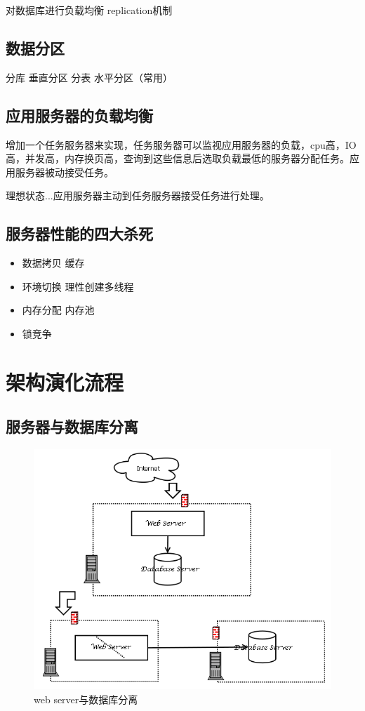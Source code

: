 \documentclass[UTF8,a4paper,8pt]{ctexbook}
\begin{document}
			对数据库进行负载均衡  replication机制
		\subsection{数据分区}
			分库  垂直分区
			分表  水平分区（常用）
			
		
		\subsection{应用服务器的负载均衡}
			增加一个任务服务器来实现，任务服务器可以监视应用服务器的负载，cpu高，IO高，并发高，内存换页高，查询到这些信息后选取负载最低的服务器分配任务。应用服务器被动接受任务。
			
			理想状态...应用服务器主动到任务服务器接受任务进行处理。
			
			
		\subsection{服务器性能的四大杀死}
			\begin{itemize}
				\item 数据拷贝  缓存
				\item 环境切换  理性创建多线程
				\item 内存分配  内存池
				\item 锁竞争
			\end{itemize}
	\section{架构演化流程}
		\subsection{服务器与数据库分离}
			\begin{figure}[ht]
				\centering
				\includegraphics[width=0.7\linewidth]{server-database}
				\caption{web server与数据库分离}
				\label{fig:server-database}
			\end{figure}
			
\end{document}
